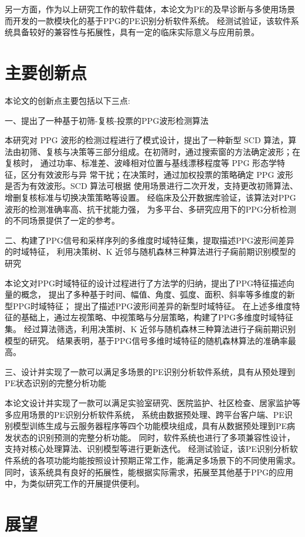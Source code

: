 另一方面，作为以上研究工作的软件载体，本论文为PE的及早诊断与多使用场景而开发的一款模块化的基于PPG的PE识别分析软件系统。
经测试验证，该软件系统具备较好的兼容性与拓展性，具有一定的临床实际意义与应用前景。
\section{主要创新点}
本论文的创新点主要包括以下三点:

一、提出了一种基于初筛-复核-投票的PPG波形检测算法

本研究对 PPG 波形的检测过程进行了模式设计，提出了一种新型 SCD 算法，算
法由初筛、复核与决策等三部分组成。在初筛时，通过搜索窗的方法确定波形；在复核时，
通过功率、标准差、波峰相对位置与基线漂移程度等 PPG 形态学特征，区分有效波形与异
常干扰；在决策时，通过加权投票的策略确定 PPG 波形是否为有效波形。SCD 算法可根据
使用场景进行二次开发，支持更改初筛算法、增删复核标准与切换决策策略等设置。
经临床及公开数据库验证，该算法对PPG波形的检测准确率高、抗干扰能力强，
为多平台、多研究应用下的PPG分析检测的不同场景提供了一定的参考。

二、构建了PPG信号和采样序列的多维度时域特征集，提取描述PPG波形间差异的时域特征，
利用决策树、K 近邻与随机森林三种算法进行子痫前期识别模型的研究

本论文对PPG时域特征的设计过程进行了方法学的归纳，提出了PPG特征描述向量的概念，
提出了多种基于时间、幅值、角度、弧度、面积、斜率等多维度的新型PPG时域特征；
提出了描述PPG波形间差异的新型时域特征。
在上述多维度特征的基础上，通过左视策略、中视策略与分层策略，构建了PPG多维度时域特征集。
经过算法筛选，利用决策树、K 近邻与随机森林三种算法进行子痫前期识别模型的研究。
结果表明，基于PPG信号多维时域特征的随机森林算法的准确率最高。

三、设计并实现了一款可以满足多场景的PE识别分析软件系统，具有从预处理到PE状态识别的完整分析功能

本论文设计并实现了一款可以满足实验室研究、医院监护、社区检查、居家监护等多应用场景的PE识别分析软件系统，
系统由数据预处理、跨平台客户端、PE识别模型训练生成与云服务器程序等四个功能模块组成，具有从数据预处理到PE病发状态的识别预测的完整分析功能。
同时，软件系统也进行了多项兼容性设计，支持对核心处理算法、识别模型等进行更新迭代。
经测试验证，该PE识别分析软件系统的各项功能均能按照设计预期正常工作，能满足多场景下的不同使用需求。
同时，该系统具有良好的拓展性，能根据实际需求，拓展至其他基于PPG的应用中，为类似研究工作的开展提供便利。

\section{展望}

